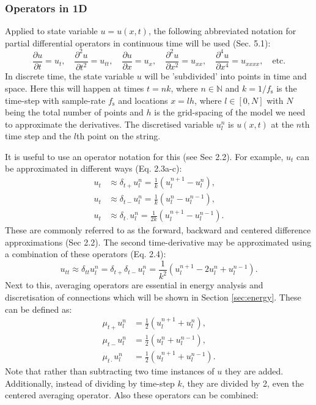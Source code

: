 \documentclass{article}
\begin{document}
\subsubsection{Operators in 1D}
Applied to state variable $u = u(x,t)$, the following abbreviated notation for partial differential operators in continuous time will be used (Sec. 5.1):
\begin{equation}\label{eq:PDA}
    \frac{\partial u}{\partial t} = u_{t}, \quad \frac{\partial^2 u}{\partial t^2} = u_{tt}, \quad
    \frac{\partial u}{\partial x} = u_{x}, \quad \frac{\partial^2 u}{\partial x^2} = u_{xx}, \quad
    \frac{\partial^4 u}{\partial x^4} = u_{xxxx}, \quad
    \text{etc}.
\end{equation}
In discrete time, the state variable $u$ will be 'subdivided' into points in time and space. Here this will happen at times $t = nk$, where $n \in \mathbb{N}$ and $k = 1 / f_\text{s}$ is the time-step with sample-rate $f_\text{s}$ and locations $x = lh$, where $l \in [0,N]$ with $N$ being the total number of points and $h$ is the grid-spacing of the model we need to approximate the derivatives. The discretised variable $u_l^n$ is $u(x,t)$ at the $n$th time step and the $l$th point on the string.

It is useful to use an operator notation for this (see Sec 2.2). For example, $u_t$ can be approximated in different ways (Eq. 2.3a-c):
\begin{subequations}\label{eq:firstOrderTime}
\begin{align}
    u_t &\approx \delta_{t+}u_l^n = \frac{1}{k} (u_l^{n+1} - u_l^n),\\
    u_t &\approx \delta_{t-}u_l^n = \frac{1}{k} (u_l^n - u_l^{n-1}),\\
    u_t &\approx \delta_{t\cdot}u_l^n = \frac{1}{2k} (u_l^{n+1} - u_l^{n-1}).
\end{align}
\end{subequations}
These are commonly referred to as the forward, backward and centered difference approximations (Sec 2.2). The second time-derivative may be approximated using a combination of these operators (Eq. 2.4):
\begin{equation}\label{eq:secondOrderTime}
u_{tt} \approx \delta_{tt}u_l^n = \delta_{t+}\delta_{t-}u_l^n = \frac{1}{k^2} (u_l^{n+1}-2u_l^n+u_l^{n-1}).
\end{equation}
Next to this, averaging operators are essential in energy analysis and discretisation of connections which will be shown in Section \ref{sec:energy}. These can be defined as:
\begin{align}
    \mu_{t+}u_l^n &= \frac{1}{2} (u_l^{n+1} + u_l^n),\\
    \mu_{t-}u_l^n &= \frac{1}{2} (u_l^n + u_l^{n-1}),\\
   \mu_{t\cdot}u_l^n &= \frac{1}{2} (u_l^{n+1} + u_l^{n-1}).
\end{align}
Note that rather than subtracting two time instances of $u$ they are added. Additionally, instead of dividing by time-step $k$, they are divided by 2, even the centered averaging operator. Also these operators can be combined:
\end{document}
